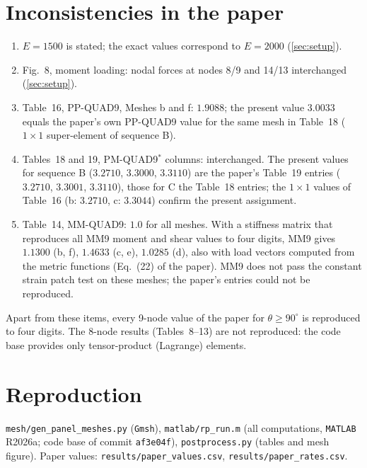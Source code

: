 \documentclass[10pt,a4paper]{article}
\begin{document}
\section{Inconsistencies in the paper}\label{sec:paper}
\begin{enumerate}
\item $E=1500$ is stated; the exact values correspond to $E=2000$ (\cref{sec:setup}).
\item Fig.~8, moment loading: nodal forces at nodes 8/9 and 14/13 interchanged (\cref{sec:setup}).
\item Table~16, PP-QUAD9, Meshes b and f: $1.9088$; the present value $3.0033$ equals the paper's
  own PP-QUAD9 value for the same mesh in Table~18 ($1\times1$ super-element of sequence B).
\item Tables~18 and 19, PM-QUAD9$^\ast$ columns: interchanged. The present values for sequence B
  ($3.2710$, $3.3000$, $3.3110$) are the paper's Table~19 entries ($3.2710$, $3.3001$, $3.3110$),
  those for C the Table~18 entries; the $1\times1$ values of Table~16 (b: $3.2710$, c: $3.3044$)
  confirm the present assignment.
\item Table~14, MM-QUAD9: $1.0$ for all meshes. With a stiffness matrix that reproduces all MM9
  moment and shear values to four digits, MM9 gives $1.1300$ (b, f), $1.4633$ (c, e), $1.0285$ (d),
  also with load vectors computed from the metric functions (Eq.~(22) of the paper). MM9 does not
  pass the constant strain patch test on these meshes; the paper's entries could not be reproduced.
\end{enumerate}
Apart from these items, every 9-node value of the paper for $\theta\ge90^\circ$ is reproduced to
four digits. The 8-node results (Tables~8--13) are not reproduced: the code base provides only
tensor-product (Lagrange) elements.

\section{Reproduction}
\texttt{mesh/gen\_panel\_meshes.py} (\texttt{Gmsh}), \texttt{matlab/rp\_run.m} (all computations,
\texttt{MATLAB} R2026a; code base of commit \texttt{af3e04f}), \texttt{postprocess.py} (tables and
mesh figure). Paper values: \texttt{results/paper\_values.csv}, \texttt{results/paper\_rates.csv}.



\end{document}
